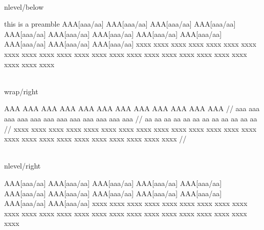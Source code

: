 \\nlevel/below

\ex[glstyle=nlevel,glftpos=below]
\begingl
\glpreamble this is a preamble\endpreamble
AAA[aaa/aa] AAA[aaa/aa] AAA[aaa/aa] AAA[aaa/aa] AAA[aaa/aa] AAA[aaa/aa]
AAA[aaa/aa] AAA[aaa/aa] AAA[aaa/aa] AAA[aaa/aa] AAA[aaa/aa] AAA[aaa/aa]
\glft
xxxx xxxx xxxx xxxx xxxx xxxx xxxx xxxx
xxxx xxxx xxxx xxxx xxxx xxxx xxxx xxxx
xxxx xxxx xxxx xxxx xxxx xxxx xxxx xxxx
\endgl
\xe

\\wrap/right

\ex[glstyle=wrap,glftpos=right]
\begingl
\gla AAA AAA AAA AAA AAA AAA AAA AAA AAA AAA AAA AAA //
\glb aaa aaa aaa aaa aaa aaa aaa aaa aaa aaa aaa aaa //
\glc aa aa aa aa aa aa aa aa aa aa aa aa //
\glft
xxxx xxxx xxxx xxxx xxxx xxxx xxxx xxxx
xxxx xxxx xxxx xxxx xxxx xxxx xxxx xxxx
xxxx xxxx xxxx xxxx xxxx xxxx xxxx xxxx //
\endgl
\xe

\\nlevel/right

\ex[glstyle=nlevel,glftpos=right]
\begingl
AAA[aaa/aa] AAA[aaa/aa] AAA[aaa/aa] AAA[aaa/aa] AAA[aaa/aa] AAA[aaa/aa]
AAA[aaa/aa] AAA[aaa/aa] AAA[aaa/aa] AAA[aaa/aa] AAA[aaa/aa] AAA[aaa/aa]
\glft
xxxx xxxx xxxx xxxx xxxx xxxx xxxx xxxx
xxxx xxxx xxxx xxxx xxxx xxxx xxxx xxxx
xxxx xxxx xxxx xxxx xxxx xxxx xxxx xxxx
\endgl
\xe

\bye


